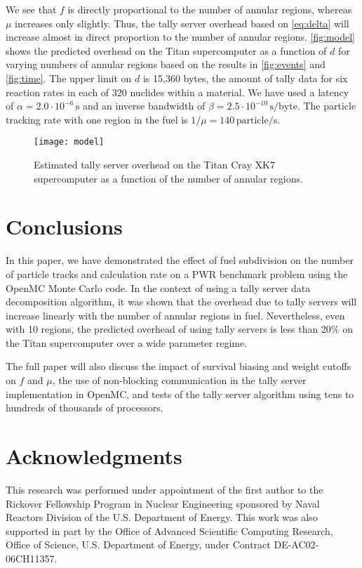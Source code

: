 \documentclass{snamc2013}
\newcommand{\unit}[1]{\ensuremath{\, \mathrm{#1}}}
\begin{document}
We see that $f$ is directly proportional to the number of annular regions,
whereas $\mu$ increases only slightly. Thus, the tally server overhead based on
\eqref{eq:delta} will increase almost in direct proportion to the number of
annular regions. \autoref{fig:model} shows the predicted overhead on the Titan
supercomputer as a function of $d$ for varying numbers of annular regions based
on the results in \autoref{fig:events} and \autoref{fig:time}. The upper limit
on $d$ is 15,360 bytes, the amount of tally data for six reaction rates in each
of 320 nuclides within a material. We have used a latency of $\alpha = 2.0 \cdot
10^{-6} \unit{s}$ and an inverse bandwidth of $\beta = 2.5 \cdot 10^{-10}
\unit{s/byte}$. The particle tracking rate with one region in the fuel is $1/\mu
= 140 \unit{particle/s}$.
\begin{figure}[htb]
  \centering
  \texttt{[image: model]}
  \caption{Estimated tally server overhead on the Titan Cray XK7 supercomputer
    as a function of the number of annular regions.}
  \label{fig:model}
\end{figure}

\section{Conclusions}

In this paper, we have demonstrated the effect of fuel subdivision on the number
of particle tracks and calculation rate on a PWR benchmark problem using the
OpenMC Monte Carlo code. In the context of using a tally server data
decomposition algorithm, it was shown that the overhead due to tally servers
will increase linearly with the number of annular regions in fuel. Nevertheless,
even with 10 regions, the predicted overhead of using tally servers is less than
20\% on the Titan supercomputer over a wide parameter regime.

The full paper will also discuss the impact of survival biasing and weight
cutoffs on $f$ and $\mu$, the use of non-blocking communication in the tally
server implementation in OpenMC, and tests of the tally server algorithm using
tens to hundreds of thousands of processors.

\section*{Acknowledgments}

This research was performed under appointment of the first author to the
Rickover Fellowship Program in Nuclear Engineering sponsored by Naval Reactors
Division of the U.S. Department of Energy. This work was also supported in part
by the Office of Advanced Scientific Computing Research, Office of Science,
U.S. Department of Energy, under Contract DE-AC02-06CH11357.



\end{document}
